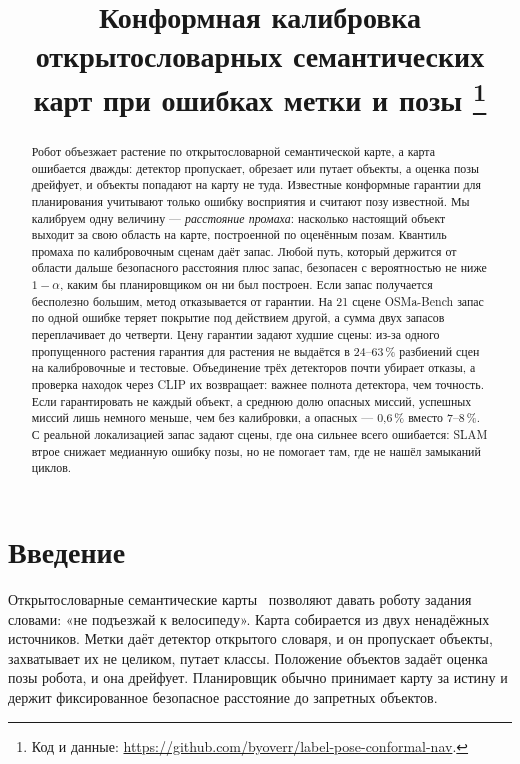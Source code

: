 \documentclass[conference,a4paper]{IEEEtran}
\theoremstyle{definition}
\begin{document}
\title{Конформная калибровка открытословарных семантических карт при ошибках метки и позы%
\thanks{Код и данные: \url{https://github.com/byoverr/label-pose-conformal-nav}.}}

\author{
}

\maketitle

\begin{abstract}
Робот объезжает растение по открытословарной семантической карте, а карта ошибается дважды: детектор пропускает,
обрезает или путает объекты, а оценка позы дрейфует, и объекты попадают на карту не туда. Известные конформные гарантии
для планирования учитывают только ошибку восприятия и считают позу известной. Мы калибруем одну величину ---
\emph{расстояние промаха}: насколько настоящий объект выходит за свою область на карте, построенной по оценённым позам.
Квантиль промаха по калибровочным сценам даёт запас. Любой путь, который держится от области дальше безопасного
расстояния плюс запас, безопасен с вероятностью не ниже $1 - \alpha$, каким бы планировщиком он ни был построен. Если
запас получается бесполезно большим, метод отказывается от гарантии. На 21 сцене OSMa-Bench запас по одной ошибке
теряет покрытие под действием другой, а сумма двух запасов переплачивает до четверти. Цену гарантии задают худшие
сцены: из-за одного пропущенного растения гарантия для растения не выдаётся в 24--63\,\% разбиений сцен на калибровочные
и тестовые. Объединение трёх
детекторов почти убирает отказы, а проверка находок через CLIP их возвращает: важнее полнота детектора, чем точность.
Если гарантировать не каждый объект, а среднюю долю опасных миссий, успешных миссий лишь немного меньше, чем без
калибровки, а опасных --- 0,6\,\% вместо 7--8\,\%. С реальной локализацией запас задают сцены, где она сильнее всего
ошибается: SLAM втрое снижает медианную ошибку позы, но не помогает там, где не нашёл замыканий циклов.
\end{abstract}

\section{Введение}

Открытословарные семантические карты~\cite{conceptgraphs} позволяют давать роботу задания словами: «не подъезжай к
велосипеду». Карта собирается из двух ненадёжных источников. Метки даёт детектор открытого словаря, и он пропускает
объекты, захватывает их не целиком, путает классы. Положение объектов задаёт оценка позы робота, и она дрейфует.
Планировщик обычно принимает карту за истину и держит фиксированное безопасное расстояние до запретных объектов.
\end{document}
